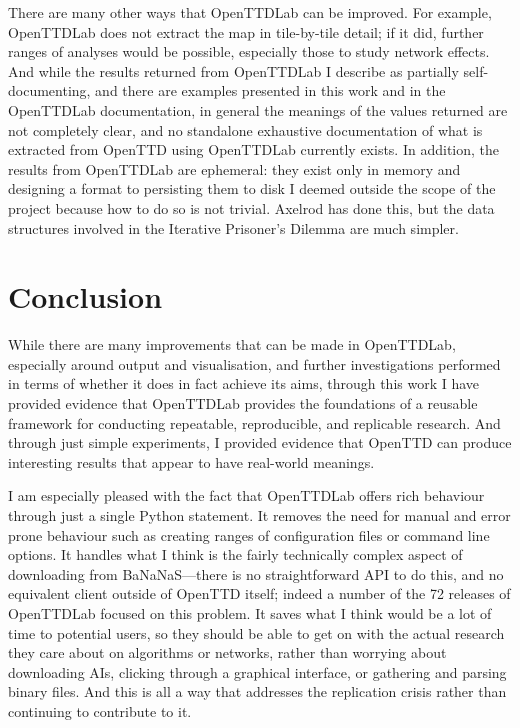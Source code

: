 \documentclass[logo,msc,dsti]{style/infthesis}    %
\begin{document}
{There are many other ways that OpenTTDLab can be improved. For example, OpenTTDLab does not extract the map in tile-by-tile detail; if it did, further ranges of analyses would be possible, especially those to study network effects. And while the results returned from OpenTTDLab I describe as partially self-documenting, and there are examples presented in this work and in the OpenTTDLab documentation, in general the meanings of the values returned are not completely clear, and no standalone exhaustive documentation of what is  extracted from OpenTTD using OpenTTDLab currently exists. In addition, the results from OpenTTDLab are ephemeral: they exist only in memory and designing a format to persisting them to disk I deemed outside the scope of the project because how to do so is not trivial. Axelrod has done this, but the data structures involved in the Iterative Prisoner's Dilemma are much simpler.


\chapter{Conclusion}
\label{chapter:conclusion}

While there are many improvements that can be made in OpenTTDLab, especially around output and visualisation, and further investigations performed in terms of whether it does in fact achieve its aims, through this work I have provided evidence that OpenTTDLab provides the foundations of a reusable framework for conducting repeatable, reproducible, and replicable research. And through just simple experiments, I provided evidence that OpenTTD can produce interesting results that appear to have real-world meanings. 

I am especially pleased with the fact that OpenTTDLab offers rich behaviour through just a single Python statement. It removes the need for manual and error prone behaviour such as creating ranges of configuration files or command line options. It handles what I think is the fairly technically complex aspect of downloading from BaNaNaS---there is no straightforward API to do this, and no equivalent client outside of OpenTTD itself; indeed a number of the 72 releases of OpenTTDLab focused on this problem. It saves what I think would be a lot of time to potential users, so they should be able to get on with the actual research they care about on algorithms or networks, rather than worrying about downloading AIs, clicking through a graphical interface, or gathering and parsing binary files. And this is all a way that addresses the replication crisis rather than continuing to contribute to it.

}
\end{document}
